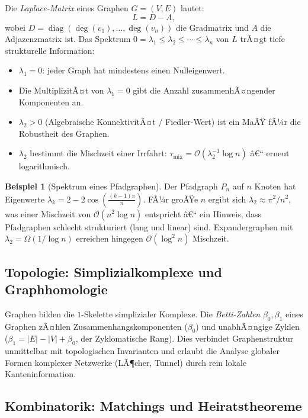 ﻿\documentclass[12pt,a4paper,twoside]{article}
\theoremstyle{definition}
\newtheorem{beispiel}{Beispiel}[section]
\theoremstyle{plain}
\theoremstyle{remark}
\begin{document}
Die \emph{Laplace-Matrix} eines Graphen $G=(V,E)$ lautet:
\[
  L = D - A,
\]
wobei $D = \operatorname{diag}(\deg(v_1), \ldots, \deg(v_n))$
die Gradmatrix und $A$ die Adjazenzmatrix ist.  Das
Spektrum $0 = \lambda_1 \leq \lambda_2 \leq \cdots \leq \lambda_n$
von $L$ trÃ¤gt tiefe strukturelle Information:

\begin{itemize}
  \item $\lambda_1 = 0$: jeder Graph hat mindestens einen Nulleigenwert.
  \item Die MultiplizitÃ¤t von $\lambda_1 = 0$ gibt die Anzahl
        zusammenhÃ¤ngender Komponenten an.
  \item $\lambda_2 > 0$ (Algebraische KonnektivitÃ¤t / Fiedler-Wert)
        ist ein MaÃŸ fÃ¼r die Robustheit des Graphen.
  \item $\lambda_2$ bestimmt die Mischzeit einer Irrfahrt:
        $\tau_{\text{mix}} = \mathcal{O}(\lambda_2^{-1} \log n)$ â€“
        erneut logarithmisch.
\end{itemize}

\begin{beispiel}[Spektrum eines Pfadgraphen]
Der Pfadgraph $P_n$ auf $n$ Knoten hat Eigenwerte
$\lambda_k = 2 - 2\cos\!\left(\tfrac{(k-1)\pi}{n}\right)$.
FÃ¼r groÃŸe $n$ ergibt sich $\lambda_2 \approx \pi^2/n^2$,
was einer Mischzeit von $\mathcal{O}(n^2 \log n)$ entspricht â€“
ein Hinweis, dass Pfadgraphen schlecht strukturiert (lang und
linear) sind.  Expandergraphen mit $\lambda_2 = \Omega(1/\log n)$
erreichen hingegen $\mathcal{O}(\log^2 n)$ Mischzeit.
\end{beispiel}

\subsection{Topologie: Simplizialkomplexe und Graphhomologie}

Graphen bilden die $1$-Skelette simplizialer Komplexe.  Die
\emph{Betti-Zahlen} $\beta_0, \beta_1$ eines Graphen zÃ¤hlen
Zusammenhangskomponenten ($\beta_0$) und unabhÃ¤ngige Zyklen
($\beta_1 = |E| - |V| + \beta_0$, der Zyklomatische Rang).
Dies verbindet Graphenstruktur unmittelbar mit topologischen
Invarianten und erlaubt die Analyse globaler Formen komplexer
Netzwerke (LÃ¶cher, Tunnel) durch rein lokale Kanteninformation.

\subsection{Kombinatorik: Matchings und Heiratstheoreme}
\end{document}

